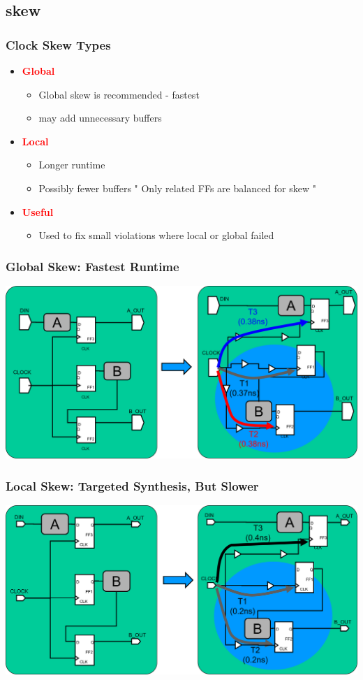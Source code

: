 \documentclass[compress]{beamer}
\begin{document}
\subsection[Skew]{skew}
\begin{frame}
	\frametitle{Clock Skew Types}
	\begin{itemize}
		\item \textcolor{red}{\textbf{Global}}
		\begin{itemize}
			\item Global skew is recommended - fastest 
			\item may add unnecessary buffers
		\end{itemize}
		\item \textcolor{red}{\textbf{Local}}
		\begin{itemize}
			\item Longer runtime
			\item Possibly fewer buffers " Only related FFs are
			balanced for skew "
		\end{itemize}
		\item \textcolor{red}{\textbf{Useful}}
		\begin{itemize}
			\item Used to fix small violations where local or global failed
		\end{itemize}
		
	\end{itemize}
\end{frame}
\begin{frame}
	\frametitle{Global Skew: Fastest Runtime}
	\begin{center}
		\includegraphics[width=\textwidth]{Global}
	\end{center}
\end{frame}
\begin{frame}
	\frametitle{Local Skew: Targeted Synthesis, But Slower}
		\begin{center}
		\includegraphics[width=\textwidth]{Local}
	\end{center}
\end{frame}
\end{document}
